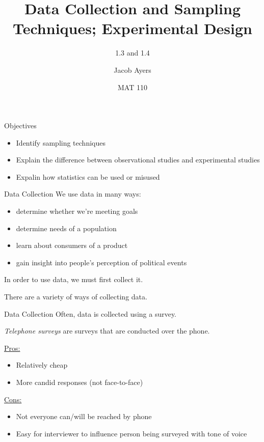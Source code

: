 \documentclass[t]{beamer}
\title[Abbr]{Data Collection and Sampling Techniques; Experimental Design}
\subtitle{1.3 and 1.4}
\author{Jacob Ayers}
\institute{Lesson \#2}
\date{MAT 110}
\newcommand{\?}{\stackrel{?}{=}}
\begin{document}
	
	\begin{frame}
		\titlepage
	\end{frame}
	
	\begin{frame}{Objectives}
		\begin{itemize}
			\item Identify sampling techniques
			\item Explain the difference between observational studies and experimental studies
			\item Expalin how statistics can be used or misused
		\end{itemize}
	\end{frame}

	\begin{frame}{Data Collection}
		We use data in many ways: \begin{itemize}
			\item determine whether we're meeting goals
			\item determine needs of a population
			\item learn about consumers of a product
			\item gain insight into people's perception of political events
		\end{itemize} \pause
	
		In order to use data, we must first collect it.
		
		There are a variety of ways of collecting data.
	\end{frame}

	\begin{frame}{Data Collection}
		Often, data is collected using a survey.
		
		\textit{Telephone surveys} are surveys that are conducted over the phone. \pause
		
		\underline{Pros:} \begin{itemize}
			\item Relatively cheap
			\item More candid responses (not face-to-face)
		\end{itemize} \pause
	
		\underline{Cons:} \begin{itemize}
			\item Not everyone can/will be reached by phone
			\item Easy for interviewer to influence person being surveyed with tone of voice
		\end{itemize}
	\end{frame}
\end{document}
